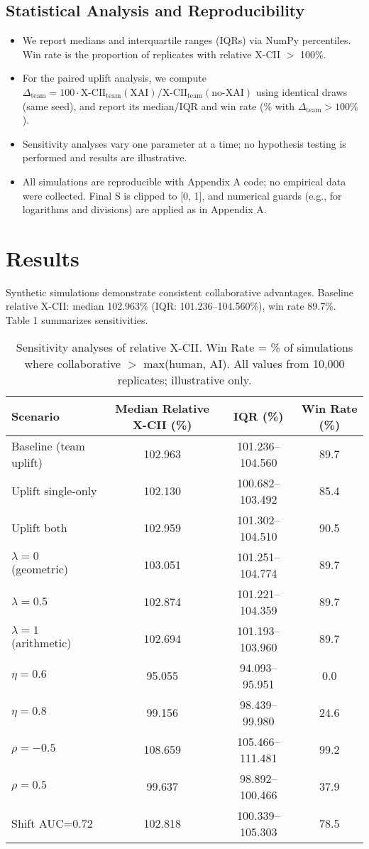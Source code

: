 \documentclass[11pt,a4paper]{article}
\begin{document}
\subsection{Statistical Analysis and Reproducibility}
\begin{itemize}
\item We report medians and interquartile ranges (IQRs) via NumPy percentiles. Win rate is the proportion of replicates with relative X-CII $>$ 100\%.
\item For the paired uplift analysis, we compute $\Delta_{\text{team}} = 100 \cdot \text{X-CII}_{\text{team}}(\text{XAI}) / \text{X-CII}_{\text{team}}(\text{no-XAI})$ using identical draws (same seed), and report its median/IQR and win rate (\% with $\Delta_{\text{team}} > 100\%$).
\item Sensitivity analyses vary one parameter at a time; no hypothesis testing is performed and results are illustrative.
\item All simulations are reproducible with Appendix A code; no empirical data were collected. Final S is clipped to [0, 1], and numerical guards (e.g., for logarithms and divisions) are applied as in Appendix A.
\end{itemize}
\section{Results}
Synthetic simulations demonstrate consistent collaborative advantages. Baseline relative X-CII: median 102.963\% (IQR: 101.236--104.560\%), win rate 89.7\%. Table 1 summarizes sensitivities.

\begin{table}[htbp]
\centering
\caption{Sensitivity analyses of relative X-CII. Win Rate = \% of simulations where collaborative $>$ max(human, AI). All values from 10,000 replicates; illustrative only.}
\begin{tabular}{@{}lccc@{}}
\toprule
Scenario & Median Relative X-CII (\%) & IQR (\%) & Win Rate (\%) \\
\midrule
Baseline (team uplift) & 102.963 & 101.236--104.560 & 89.7 \\
Uplift single-only & 102.130 & 100.682--103.492 & 85.4 \\
Uplift both & 102.959 & 101.302--104.510 & 90.5 \\
$\lambda=0$ (geometric) & 103.051 & 101.251--104.774 & 89.7 \\
$\lambda=0.5$ & 102.874 & 101.221--104.359 & 89.7 \\
$\lambda=1$ (arithmetic) & 102.694 & 101.193--103.960 & 89.7 \\
$\eta=0.6$ & 95.055 & 94.093--95.951 & 0.0 \\
$\eta=0.8$ & 99.156 & 98.439--99.980 & 24.6 \\
$\rho=-0.5$ & 108.659 & 105.466--111.481 & 99.2 \\
$\rho=0.5$ & 99.637 & 98.892--100.466 & 37.9 \\
Shift AUC=0.72 & 102.818 & 100.339--105.303 & 78.5 \\
\bottomrule
\end{tabular}
\label{tab:results}
\end{table}
\end{document}

